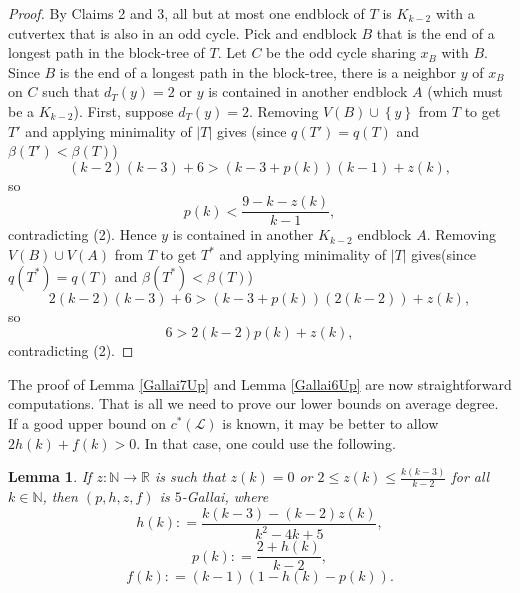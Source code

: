 \documentclass[10pt]{article}
\theoremstyle{plain}
\newtheorem{lem}[thm]{Lemma}
\theoremstyle{definition}
\theoremstyle{remark}
\newcommand{\fancy}[1]{\mathcal{#1}}
\newcommand{\IN}{\mathbb{N}}
\newcommand{\IR}{\mathbb{R}}
\renewcommand{\L}{\fancy{L}}
\newcommand{\set}[1]{\left\{ #1 \right\}}
\newcommand{\card}[1]{\left|#1\right|}
\newcommand{\func}[3]{#1\colon #2 \rightarrow #3}
\newcommand{\parens}[1]{\left( #1 \right)}
\newcommand{\DefinedAs}{\mathrel{\mathop:}=}
\begin{document}
\begin{proof}
By Claims 2 and 3, all but at most one endblock of $T$ is $K_{k-2}$ with a cutvertex that is also in an odd cycle. 
Pick and endblock $B$ that is the end of a
longest path in the block-tree of $T$.  Let $C$ be the odd cycle sharing $x_B$ with $B$.  Since $B$ is the end of a longest path in the block-tree, there is
a neighbor $y$ of $x_B$ on $C$ such that $d_T(y) = 2$ or $y$ is contained in another endblock $A$ (which must be a $K_{k-2}$).  
First, suppose $d_T(y) = 2$.
Removing $V(B) \cup \set{y}$ from $T$ to get $T'$ and applying minimality of $\card{T}$ gives (since $q(T') = q(T)$ and $\beta(T') < \beta(T)$)
\[(k-2)(k-3) + 6 > \parens{k-3 + p(k)}\parens{k-1} + z(k),\]
so
\[p(k) < \frac{9-k-z(k)}{k-1},\]
contradicting (2).
Hence $y$ is contained in another $K_{k-2}$ endblock $A$.  Removing $V(B) \cup V(A)$ from $T$ to get $T^*$ and applying minimality of $\card{T}$ gives(since $q(T^*) = q(T)$ and $\beta(T^*) < \beta(T)$)
\[2(k-2)(k-3) + 6 > \parens{k-3 + p(k)}\parens{2(k-2)} + z(k),\]
so
\[6 > 2(k-2)p(k) + z(k),\]
contradicting (2).
\end{proof}

The proof of Lemma \ref{Gallai7Up} and Lemma \ref{Gallai6Up} are now straightforward computations.  
That is all we need to prove our lower bounds on average degree. If a good upper bound on $c^*(\L)$ is known, it may be better to allow $2h(k) + f(k) > 0$.
In that case, one could use the following.

\begin{lem}
If $\func{z}{\IN}{\IR}$ is such that $z(k) = 0$ or $2 \le z(k) \le \frac{k(k-3)}{k-2}$  for all $k \in \IN$, then 
$(p,h,z,f)$ is $5$-Gallai, where
\[h(k) \DefinedAs \frac{k(k-3) - (k-2)z(k)}{k^2-4k+5},\]
\[p(k) \DefinedAs \frac{2 + h(k)}{k-2},\]
\[f(k) \DefinedAs (k-1)(1 - h(k) - p(k)).\]
\end{lem}



\end{document}
